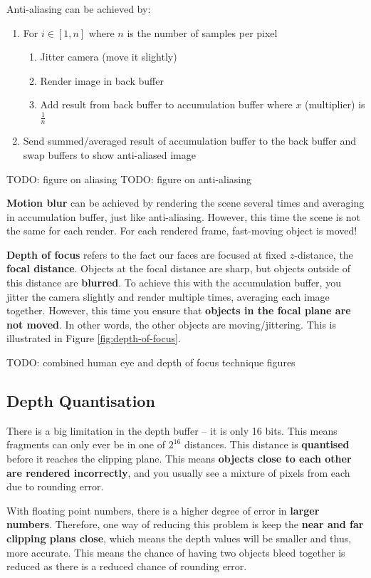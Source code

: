 \documentclass{article}
\begin{document}
Anti-aliasing can be achieved by:
\begin{enumerate}
	\item For $i \in [1,n]$ where $n$ is the number of samples per pixel
	\begin{enumerate}
		\item Jitter camera (move it slightly)
		\item Render image in back buffer 
		\item Add result from back buffer to accumulation buffer where $x$ (multiplier) is $\frac{1}{n}$
	\end{enumerate}
	\item Send summed/averaged result of accumulation buffer to the back buffer and swap buffers to show anti-aliased image
\end{enumerate}

TODO: figure on aliasing
TODO: figure on anti-aliasing

\textbf{Motion blur} can be achieved by rendering the scene several times and averaging in accumulation buffer, just like anti-aliasing. However, this time the scene is not the same for each render. For each rendered frame, fast-moving object is moved!

\textbf{Depth of focus} refers to the fact our faces are focused at fixed $z$-distance, the  \textbf{focal distance}. Objects at the focal distance are sharp, but objects outside of this distance are \textbf{blurred}. To achieve this with the accumulation buffer, you jitter the camera slightly and render multiple times, averaging each image together. However, this time you ensure that \textbf{objects in the focal plane are not moved}. In other words, the other objects are moving/jittering. This is illustrated in Figure \ref{fig:depth-of-focus}.

TODO: combined human eye and depth of focus technique figures

\subsection{Depth Quantisation}

There is a big limitation in the depth buffer -- it is only 16 bits. This means fragments can only ever be in one of $2^{16}$ distances. This distance is \textbf{quantised} before it reaches the clipping plane. This means \textbf{objects close to each other are rendered incorrectly}, and you usually see a mixture of pixels from each due to rounding error.

With floating point numbers, there is a higher degree of error in \textbf{larger numbers}.  Therefore, one way of reducing this problem is keep the \textbf{near and far clipping plans close}, which means the depth values will be smaller and thus, more accurate. This means the chance of having two objects bleed together is reduced as there is a reduced chance of rounding error.
\end{document}
